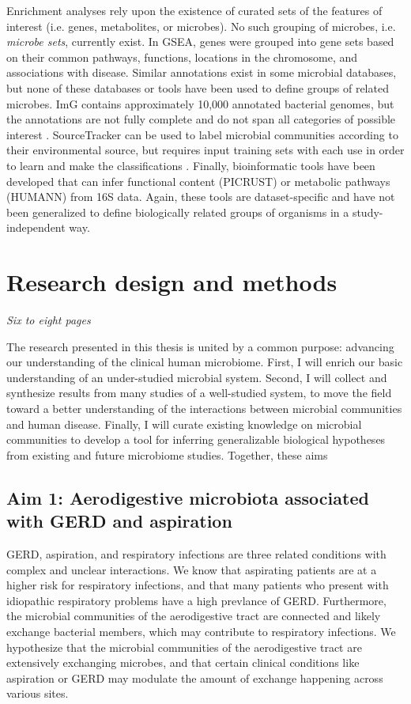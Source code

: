 \documentclass[12pt]{article}
\begin{document}
Enrichment analyses rely upon the existence of curated sets of the features of interest (i.e. genes, metabolites, or microbes).
No such grouping of microbes, i.e. \textit{microbe sets}, currently exist. 
In GSEA, genes were grouped into gene sets based on their common 
pathways, functions, locations in the chromosome, and associations 
with disease. Similar annotations exist in some microbial databases, 
but none of these databases or tools have been used to define groups 
of related microbes. ImG contains approximately 10,000 annotated 
bacterial genomes, but the annotations are not fully complete and do 
not span all categories of possible interest \cite{markowitz-img-2013}. SourceTracker 
can be used to label microbial communities according to their 
environmental source, but requires input training sets with each use 
in order to learn and make the classifications \cite{knights-sourcetracker-2011}. 
Finally, bioinformatic tools have been developed that can infer functional 
content (PICRUST) \cite{langille-picrust-2013} or metabolic pathways 
(HUMANN) \cite{abubucker-humann-2012} from 16S data. Again, 
these tools are dataset-specific and have not been generalized to 
define biologically related groups of organisms in a study-independent way.

\section{Research design and methods}
\textit{Six to eight pages}

The research presented in this thesis is united by a common purpose: 
advancing our understanding of the clinical human microbiome.
First, I will enrich our basic understanding of an under-studied 
microbial system. Second, I will collect and synthesize 
results from many studies of a well-studied system, to move the 
field toward a better understanding of the interactions between 
microbial communities and human disease. Finally, I will curate
existing knowledge on microbial communities to develop a tool for 
inferring generalizable biological hypotheses from existing and future microbiome studies. Together, these aims

\subsection{Aim 1: Aerodigestive microbiota associated with GERD and aspiration}

GERD, aspiration, and respiratory infections are three related
conditions with complex and unclear interactions.
We know that aspirating patients are at a higher risk for respiratory
infections, and that many patients who present with idiopathic
respiratory problems have a high prevlance of GERD. 
Furthermore, the microbial communities of the aerodigestive tract
are connected and likely exchange bacterial members, which may
contribute to respiratory infections. We hypothesize that the
microbial communities of the aerodigestive tract are extensively
exchanging microbes, and that certain clinical conditions like aspiration
or GERD may modulate the amount of exchange happening across various sites.
\end{document}
